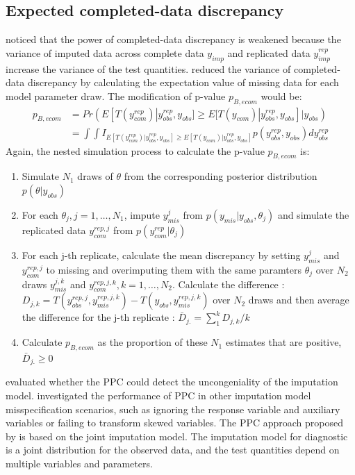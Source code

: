 	\subsection{Expected completed-data discrepancy}
	\citet{he2012diagnosing} noticed that the power of completed-data discrepancy is weakened because the variance of imputed data across complete data $y_{imp}$ and replicated data $y_{imp}^{rep}$ increase the variance of the test quantities. \citet{he2012diagnosing} reduced the variance of completed-data discrepancy by calculating the expectation value of missing data for each model parameter draw. 
	The modification of p-value $p_{B, ecom}$ would be:  
	\begin{equation}
		\begin{array}{ll}
			p_{B, ecom} &= Pr(E[T(y_{com}^{rep})|y_{obs}^{rep}, y_{obs}] \ge E[T(y_{com})|y_{obs}^{rep}, y_{obs}]|y_{obs})\\
			&= \int\int I_{E[T(y_{com}^{rep})|y_{obs}^{rep}, y_{obs}] \ge E[T(y_{com})|y_{obs}^{rep}, y_{obs}]}p(y_{obs}^{rep}, y_{obs})dy_{obs}^{rep}
		\end{array} 
	\end{equation}
	Again, the nested simulation process to calculate the p-value $p_{B, ecom}$ is:
	\begin{enumerate}
		\item Simulate $N_{1}$ draws of $\theta$ from the corresponding posterior distribution $p(\theta|y_{obs})$
		\item For each $\theta_{j}, j=1, \dots, N_{1}$, impute $y_{mis}^j$ from $p(y_{mis}|y_{obs}, \theta_{j})$ and simulate the replicated data $y_{com}^{rep, j}$ from $p(y_{com}^{rep}|\theta_{j})$
		\item For each j-th replicate, calculate the mean discrepancy by setting $y_{mis}^j$ and $y_{com}^{rep, j}$ to missing and overimputing them with the same paramters $\theta_{j}$ over $N_{2}$ draws $y_{mis}^{j, k}$ and $y_{com}^{rep, j, k}, k = 1, \dots, N_{2}$. Calculate the difference : $D_{j, k} = T(y_{obs}^{rep, j}, y_{mis}^{rep, j, k}) - T(y_{obs}, y_{mis}^{rep, j, k})$ over $N_{2}$ draws and then average the difference for the j-th replicate : $\bar{D}_{j.} = \sum_{1}^{k}D_{j, k}/k$
		\item Calculate $p_{B, ecom}$ as the proportion of these $N_{1}$ estimates that are positive, $\bar{D}_{j.} \ge 0$    
	\end{enumerate}
	
	\citet{he2012diagnosing} evaluated whether the PPC could detect the uncongeniality of the imputation model. \citet{nguyen2015posterior} investigated the performance of PPC in other imputation model misspecification scenarios, such as ignoring the response variable and auxiliary variables or failing to transform skewed variables. The PPC approach proposed by \citet{he2012diagnosing} is based on the joint imputation model. The imputation model for diagnostic is a joint distribution for the observed data, and the test quantities depend on multiple variables and parameters. 
	
